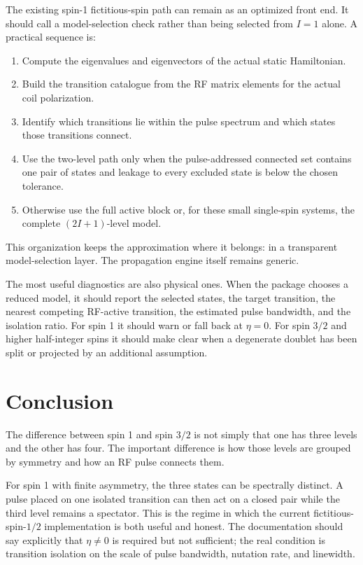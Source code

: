 \documentclass[11pt,letterpaper]{article}
\begin{document}
The existing spin-1 fictitious-spin path can remain as an optimized front end. It should call a model-selection check rather than being selected from $I=1$ alone. A practical sequence is:
\begin{enumerate}
\item Compute the eigenvalues and eigenvectors of the actual static Hamiltonian.
\item Build the transition catalogue from the RF matrix elements for the actual coil polarization.
\item Identify which transitions lie within the pulse spectrum and which states those transitions connect.
\item Use the two-level path only when the pulse-addressed connected set contains one pair of states and leakage to every excluded state is below the chosen tolerance.
\item Otherwise use the full active block or, for these small single-spin systems, the complete $(2I+1)$-level model.
\end{enumerate}

This organization keeps the approximation where it belongs: in a transparent model-selection layer. The propagation engine itself remains generic.

The most useful diagnostics are also physical ones. When the package chooses a reduced model, it should report the selected states, the target transition, the nearest competing RF-active transition, the estimated pulse bandwidth, and the isolation ratio. For spin 1 it should warn or fall back at $\eta=0$. For spin $3/2$ and higher half-integer spins it should make clear when a degenerate doublet has been split or projected by an additional assumption.

\section{Conclusion}

The difference between spin 1 and spin $3/2$ is not simply that one has three levels and the other has four. The important difference is how those levels are grouped by symmetry and how an RF pulse connects them.

For spin 1 with finite asymmetry, the three states can be spectrally distinct. A pulse placed on one isolated transition can then act on a closed pair while the third level remains a spectator. This is the regime in which the current fictitious-spin-$1/2$ implementation is both useful and honest. The documentation should say explicitly that $\eta\neq0$ is required but not sufficient; the real condition is transition isolation on the scale of pulse bandwidth, nutation rate, and linewidth.
\end{document}
